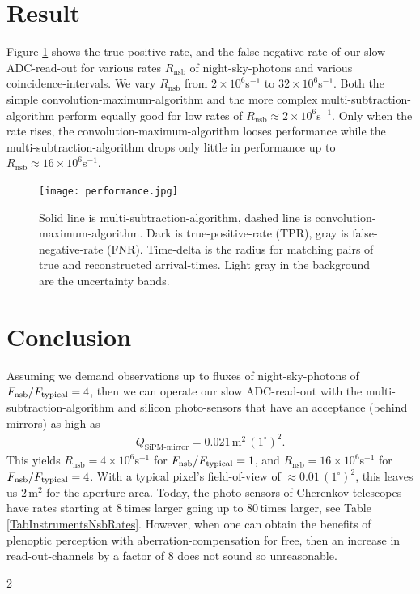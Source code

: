 \documentclass{article}%
\begin{document}
\begin{multicols}{2}
\section*{Result}
%
Figure \ref{FigSimPerformanceVsNsb} shows the true-positive-rate, and the false-negative-rate of our slow ADC-read-out for various rates $R_\text{nsb}$ of night-sky-photons and various coincidence-intervals.
%
We vary $R_\text{nsb}$ from $2\times10^6$s$^{-1}$ to $32\times10^6$s$^{-1}$.
%
Both the simple convolution-maximum-algorithm and the more complex multi-subtraction-algorithm perform equally good for low rates of $R_\text{nsb} \approx 2\times{}10^{6}$s$^{-1}$.
%
Only when the rate rises, the convolution-maximum-algorithm looses performance while the multi-subtraction-algorithm drops only little in performance up to $R_\text{nsb} \approx 16\times{}10^{6}$s$^{-1}$.
%
\begin{figure}[H]%
\centering%
\texttt{[image: performance.jpg]}%
\caption{%
Solid line is multi-subtraction-algorithm, dashed line is convolution-maximum-algorithm.
%
Dark is true-positive-rate (TPR), gray is false-negative-rate (FNR).
%
Time-delta is the radius for matching pairs of true and reconstructed arrival-times.
%
Light gray in the background are the uncertainty bands.
}%
\label{FigSimPerformanceVsNsb}
\end{figure}
%
\section*{Conclusion}
%
Assuming we demand observations up to fluxes of night-sky-photons of $F_\text{nsb}{}/F_\text{typical}{} = 4$, then we can operate our slow ADC-read-out with the multi-subtraction-algorithm and silicon photo-sensors that have an acceptance (behind mirrors) as high as
\begin{eqnarray}
Q_\text{SiPM-mirror} = 0.021\,\text{m}^{2}\,(1^\circ{})^2.
\end{eqnarray}
%
This yields $R_\text{nsb} = 4\times{}10^6$s$^{-1}$ for $F_\text{nsb}{}/F_\text{typical}{} = 1$, and $R_\text{nsb} = 16\times{}10^6$s$^{-1}$ for $F_\text{nsb}{}/F_\text{typical}{} = 4$.
%
With a typical pixel's field-of-view of $\approx{} 0.01\,(1^\circ{})^2$, this leaves us $2\,$m$^{2}$ for the aperture-area.
%
Today, the photo-sensors of Cherenkov-telescopes have rates starting at 8\,times larger going up to 80\,times larger, see Table \ref{TabInstrumentsNsbRates}.
%
However, when one can obtain the benefits of plenoptic perception with aberration-compensation for free, then an increase in read-out-channels by a factor of 8 does not sound so unreasonable.
%
%
%
\end{multicols}{2}%
\end{document}
